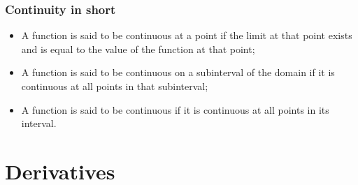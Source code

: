 \documentclass{article}
\begin{document}
\begin{center}
\end{center}

\subsubsection{Continuity in short}
\begin{itemize}
    \item A function is said to be continuous at a point if the limit at that point exists and is equal to the value of the function at that point;
    \item A function is said to be continuous on a subinterval of the domain if it is continuous at all points in that subinterval;
    \item A function is said to be continuous if it is continuous at all points in its interval.
\end{itemize}

\newpage
\section{Derivatives}
\end{document}
